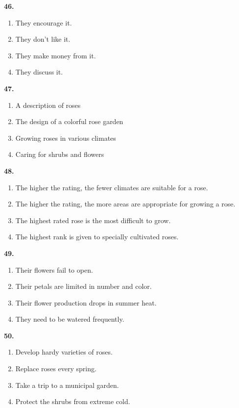 \documentclass[12pt]{article}
\begin{document}
\par
\vspace{0.25\baselineskip}
\noindent\textbf{46.}
\begin{enumerate}[label=(\Alph*),leftmargin=*,itemsep=0.2em]
\item They encourage it.
\item They don't like it.
\item They make money from it.
\item They discuss it.
\end{enumerate}
\par
\vspace{0.25\baselineskip}
\noindent\textbf{47.}
\begin{enumerate}[label=(\Alph*),leftmargin=*,itemsep=0.2em]
\item A description of roses
\item The design of a colorful rose garden
\item Growing roses in various climates
\item Caring for shrubs and flowers
\end{enumerate}
\par
\vspace{0.25\baselineskip}
\noindent\textbf{48.}
\begin{enumerate}[label=(\Alph*),leftmargin=*,itemsep=0.2em]
\item The higher the rating, the fewer climates are suitable for a rose.
\item The higher the rating, the more areas are appropriate for growing a rose.
\item The highest rated rose is the most difficult to grow.
\item The highest rank is given to specially cultivated roses.
\end{enumerate}
\par
\vspace{0.25\baselineskip}
\noindent\textbf{49.}
\begin{enumerate}[label=(\Alph*),leftmargin=*,itemsep=0.2em]
\item Their flowers fail to open.
\item Their petals are limited in number and color.
\item Their flower production drops in summer heat.
\item They need to be watered frequently.
\end{enumerate}
\par
\vspace{0.25\baselineskip}
\noindent\textbf{50.}
\begin{enumerate}[label=(\Alph*),leftmargin=*,itemsep=0.2em]
\item Develop hardy varieties of roses.
\item Replace roses every spring.
\item Take a trip to a municipal garden.
\item Protect the shrubs from extreme cold.
\end{enumerate}
\par
\vspace{0.25\baselineskip}
\end{document}

